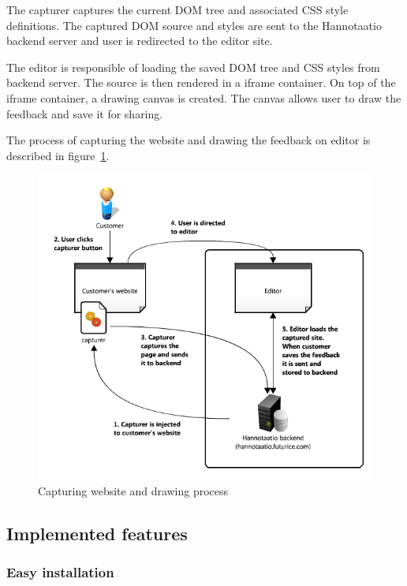 \documentclass[english,12pt,a4paper,pdftex]{article}
\begin{document}
The capturer captures the current \ac{DOM} tree and associated \ac{CSS} style definitions. The captured \ac{DOM} source and styles are sent to the Hannotaatio backend server and user is redirected to the editor site.

The editor is responsible of loading the saved \ac{DOM} tree and \ac{CSS} styles from backend server. The source is then rendered in a iframe container. On top of the iframe container, a drawing canvas is created. The canvas allows user to draw the feedback and save it for sharing.

The process of capturing the website and drawing the feedback on editor is described in figure~\ref{fig:hannotaatio_architecture}.

\begin{figure}[htb]
\begin{center}
\includegraphics[width=1.0\textwidth]{hannotaatio_architecture.png}
\end{center}
\caption{Capturing website and drawing process}
\label{fig:hannotaatio_architecture}
\end{figure}

\subsection{Implemented features}

\subsubsection{Easy installation}
\end{document}
